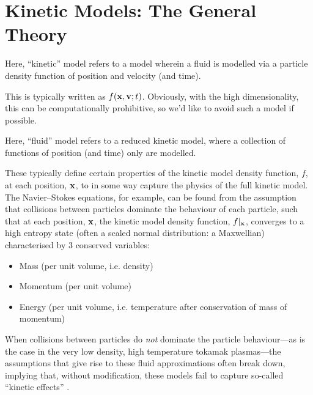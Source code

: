 \section{Kinetic Models: The General Theory}
    
    \begin{definition}
        Here, ``kinetic'' model refers to a model wherein a fluid is modelled via a particle density function of position and velocity (and time).
    \end{definition}
    
    This is typically written as $f(\mathbf{x}, \mathbf{v}; t)$. Obviously, with the high dimensionality, this can be computationally prohibitive, so we'd like to avoid such a model if possible.
    
    
    \begin{definition}
        Here, ``fluid'' model refers to a reduced kinetic model, where a collection of functions of position (and time) only are modelled.
    \end{definition}
    
    These typically define certain properties of the kinetic model density function, $f$, at each position, $\mathbf{x}$, to in some way capture the physics of the full kinetic model. The Navier–Stokes equations, for example, can be found from the assumption that collisions between particles dominate the behaviour of each particle, such that at each position, $\mathbf{x}$, the kinetic model density function, $f|_{\mathbf{x}}$, converges to a high entropy state (often a scaled normal distribution: a Maxwellian) characterised by 3 conserved variables:
    \begin{itemize}
        \item  Mass (per unit volume, i.e. density)
        \item  Momentum (per unit volume)
        \item  Energy (per unit volume, i.e. temperature after conservation of mass of momentum)
    \end{itemize}
    When collisions between particles do \emph{not} dominate the particle behaviour—as is the case in the very low density, high temperature  tokamak plasmas—the assumptions that give rise to these fluid approximations often break down, implying that, without modification, these models fail to capture so-called ``kinetic effects'' .
    

